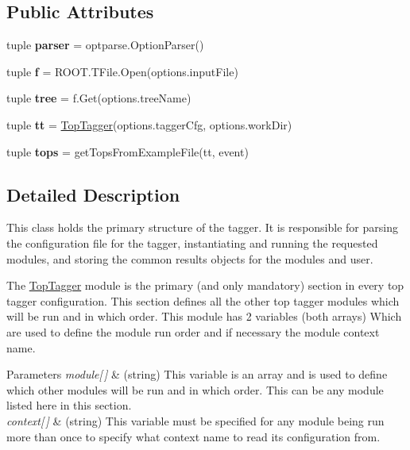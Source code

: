 \subsection*{Public Attributes}
\begin{DoxyCompactItemize}
\item 
\hypertarget{classTopTagger_a482c3ca721ab70156011038be1ab88b8}{tuple {\bfseries parser} = optparse.\-Option\-Parser()}\label{classTopTagger_a482c3ca721ab70156011038be1ab88b8}

\item 
\hypertarget{classTopTagger_a9439149c855b5990c2b8382f56881720}{tuple {\bfseries f} = R\-O\-O\-T.\-T\-File.\-Open(options.\-input\-File)}\label{classTopTagger_a9439149c855b5990c2b8382f56881720}

\item 
\hypertarget{classTopTagger_adb9ad8b9c2a2261fc433b96f8adcb5cb}{tuple {\bfseries tree} = f.\-Get(options.\-tree\-Name)}\label{classTopTagger_adb9ad8b9c2a2261fc433b96f8adcb5cb}

\item 
\hypertarget{classTopTagger_a8f479f6e3e86c29ffe18b45eaf87b680}{tuple {\bfseries tt} = \hyperlink{classTopTagger_1_1TopTagger}{Top\-Tagger}(options.\-tagger\-Cfg, options.\-work\-Dir)}\label{classTopTagger_a8f479f6e3e86c29ffe18b45eaf87b680}

\item 
\hypertarget{classTopTagger_a5fe6daaea9a504350d3c1c33dd87e94d}{tuple {\bfseries tops} = get\-Tops\-From\-Example\-File(tt, event)}\label{classTopTagger_a5fe6daaea9a504350d3c1c33dd87e94d}

\end{DoxyCompactItemize}


\subsection{Detailed Description}
This class holds the primary structure of the tagger. It is responsible for parsing the configuration file for the tagger, instantiating and running the requested modules, and storing the common results objects for the modules and user.

The \hyperlink{classTopTagger}{Top\-Tagger} module is the primary (and only mandatory) section in every top tagger configuration. This section defines all the other top tagger modules which will be run and in which order. This module has 2 variables (both arrays) Which are used to define the module run order and if necessary the module context name. 
\begin{DoxyParams}{Parameters}
{\em module\mbox{[}$\,$\mbox{]}} & (string) This variable is an array and is used to define which other modules will be run and in which order. This can be any module listed here in this section. \\
\hline
{\em context\mbox{[}$\,$\mbox{]}} & (string) This variable must be specified for any module being run more than once to specify what context name to read its configuration from. \\
\hline
\end{DoxyParams}


